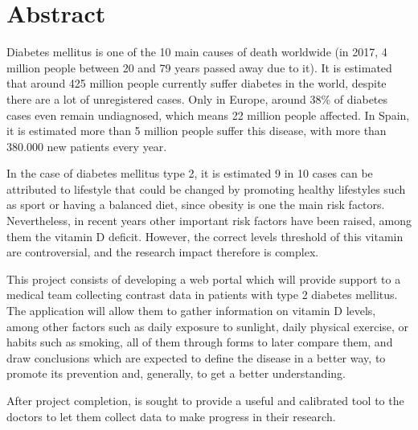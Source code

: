 \chapter*{Abstract}

Diabetes mellitus is one of the 10 main causes of death worldwide (in 2017, 4 million people between 20 and 79 years passed away due to it). It is estimated that around 425 million people currently suffer diabetes in the world, despite there are a lot of unregistered cases. Only in Europe, around 38\% of diabetes cases  even remain undiagnosed, which means 22 million people affected. In Spain, it is estimated more than 5 million people suffer this disease, with more than 380.000 new patients every year.
 \newline
 	
In the case of diabetes mellitus type 2, it is estimated 9 in 10 cases can be attributed to lifestyle that could be changed by promoting  healthy lifestyles such as sport or having a balanced diet, since obesity is one the main risk factors. Nevertheless, in recent years other important risk factors have been raised, among them the vitamin D deficit. However, the  correct levels threshold  of this vitamin are controversial, and the research impact therefore is complex. \newline
 	
This project consists of developing a web portal which will provide support to a medical team collecting contrast data in patients with type 2 diabetes mellitus. The application will allow them to gather information on vitamin D levels, among other factors such as daily exposure to sunlight, daily physical exercise, or habits such as smoking, all of them through forms to later compare them, and draw conclusions which are expected to define the disease in a better way, to promote its prevention and, generally, to get a better understanding. \newline
 	  
After project completion, is sought to provide a useful and calibrated tool to the doctors to let them collect data to make progress in their research.
 	
 	
